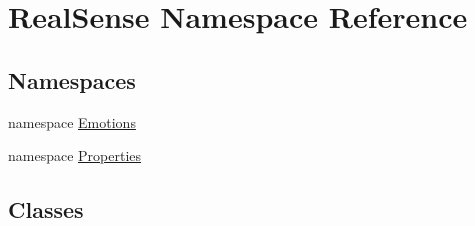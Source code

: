 \hypertarget{namespace_real_sense}{}\section{Real\+Sense Namespace Reference}
\label{namespace_real_sense}
\subsection*{Namespaces}
\begin{DoxyCompactItemize}
\item 
namespace \hyperlink{namespace_real_sense_1_1_emotions}{Emotions}
\item 
namespace \hyperlink{namespace_real_sense_1_1_properties}{Properties}
\end{DoxyCompactItemize}
\subsection*{Classes}
